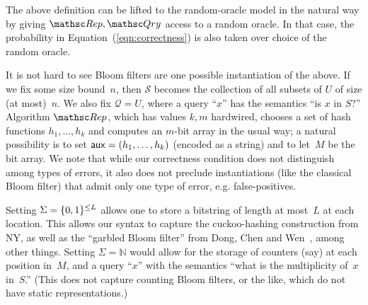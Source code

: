 The above definition can be lifted to the random-oracle model in the natural way
by giving $\Rep, \Qry$ access to a random oracle. In that case,
the probability in Equation~(\ref{eqn:correctness})
is also taken over choice of the random oracle.

It is not hard to see Bloom filters are one possible instantiation of the above. If we fix some
size bound~$n$, then $\mathcal{S}$ becomes the collection of all subsets of $U$
of size (at most)~$n$. We also fix $\mathcal{Q} = U$, where a query ``$x$'' has
the semantics ``is $x$ in $S$?'' Algorithm $\Rep$, which has values $k, m$ hardwired,
chooses a set of hash functions $h_1, \ldots, h_k$ and computes an $m$-bit
array in the usual way; a natural possibility is to set ${\sf aux} = (h_1, \ldots, h_k)$ (encoded as a string) and
to let~$M$ be the bit array.  
We note that while our correctness condition does not distinguish among types of errors, it also does not preclude instantiations (like the classical Bloom filter) that admit only one type of error, e.g. false-positives.  

Setting $\Sigma=\{0,1\}^{\leq L}$ allows one to store a bitstring of length at most~$L$ at each location.  This allows our syntax to capture the cuckoo-hashing construction from NY, as well as the ``garbled Bloom filter'' from Dong, Chen and Wen~\cite{xxx}, among other things.  Setting $\Sigma=\mathbb{N}$ would allow for the storage of counters (say) at each position in~$M$, and a query ``$x$'' with the semantics ``what is the multiplicity of~$x$ in~$S$.''  (This does not capture counting Bloom filters, or the like, which do not have static representations.)  

